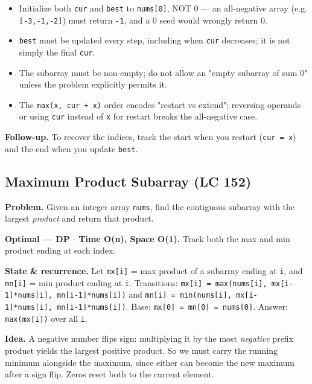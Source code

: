 \documentclass[11pt]{article}
\providecommand{\tightlist}{\setlength{\itemsep}{1pt}\setlength{\parskip}{0pt}}
\begin{document}
\begin{itemize}
\tightlist
\item
  Initialize both \texttt{cur} and \texttt{best} to \texttt{nums{[}0{]}}, NOT 0 --- an all-negative array (e.g. \texttt{{[}-3,-1,-2{]}}) must return \texttt{-1}, and a 0 seed would wrongly return 0.
\item
  \texttt{best} must be updated every step, including when \texttt{cur} decreases; it is not simply the final \texttt{cur}.
\item
  The subarray must be non-empty; do not allow an "empty subarray of sum 0" unless the problem explicitly permits it.
\item
  The \texttt{max(x,\ cur\ +\ x)} order encodes "restart vs extend"; reversing operands or using \texttt{cur} instead of \texttt{x} for restart breaks the all-negative case.
\end{itemize}

\textbf{Follow-up.} To recover the indices, track the start when you restart (\texttt{cur\ =\ x}) and the end when you update \texttt{best}.

\subsection{Maximum Product Subarray (LC 152)}\label{maximum-product-subarray-lc-152}

\textbf{Problem.} Given an integer array \texttt{nums}, find the contiguous subarray with the largest \emph{product} and return that product.

\textbf{Optimal --- DP \(\cdot\) Time O(n), Space O(1).} Track both the max and min product ending at each index.

\textbf{State \& recurrence.} Let \texttt{mx{[}i{]}} = max product of a subarray ending at \texttt{i}, and \texttt{mn{[}i{]}} = min product ending at \texttt{i}. Transitions: \texttt{mx{[}i{]}\ =\ max(nums{[}i{]},\ mx{[}i-1{]}*nums{[}i{]},\ mn{[}i-1{]}*nums{[}i{]})} and \texttt{mn{[}i{]}\ =\ min(nums{[}i{]},\ mx{[}i-1{]}*nums{[}i{]},\ mn{[}i-1{]}*nums{[}i{]})}. Base: \texttt{mx{[}0{]}\ =\ mn{[}0{]}\ =\ nums{[}0{]}}. Answer: \texttt{max(mx{[}i{]})} over all \texttt{i}.

\textbf{Idea.} A negative number flips sign: multiplying it by the most \emph{negative} prefix product yields the largest positive product. So we must carry the running minimum alongside the maximum, since either can become the new maximum after a sign flip. Zeros reset both to the current element.
\end{document}
